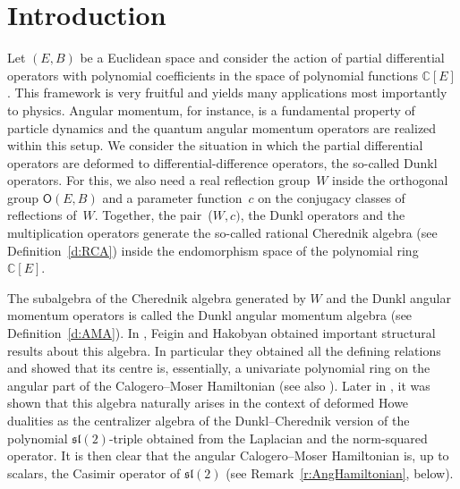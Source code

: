 \documentclass[pdftex]{sigma}
\numberwithin{equation}{section}
\newcommand{\bbc}{\mathbb{C}}
\begin{document}
\section{Introduction}
Let $(E,B)$ be a Euclidean space and consider the action of partial differential operators with polynomial coefficients in the space of polynomial functions $\bbc[E]$. This framework is very fruitful and yields many applications most importantly to physics. Angular momentum, for instance, is a fundamental property of particle dynamics and the quantum angular momentum operators are realized within this setup. We consider the situation in which the partial differential operators are deformed to differential-difference operators, the so-called Dunkl operators. For this, we also need a real reflection group~$W$ inside the orthogonal group $\mathsf{O}(E,B)$ and a parameter function~$c$ on the conjugacy classes of reflections of~$W$. Together, the pair~($W,c)$, the Dunkl operators and the multiplication operators generate the so-called rational Cherednik algebra (see Definition~\ref{d:RCA}) inside the endomorphism space of the polynomial ring~$\mathbb{C}[E]$.

The subalgebra of the Cherednik algebra generated by $W$ and the Dunkl angular momentum operators is called the Dunkl angular momentum algebra (see Definition~\ref{d:AMA}). In \cite{FH15}, Feigin and Hakobyan obtained important structural results about this algebra. In particular they obtained all the defining relations and showed that its centre is, essentially, a univariate polynomial ring on the angular part of the Calogero--Moser Hamiltonian (see also \cite[Remark~3.3]{FH19}). Later in \cite{CDM20}, it was shown that this algebra naturally arises in the context of deformed Howe dualities as the centralizer algebra of the Dunkl--Cherednik version of the polynomial $\mathfrak{sl}(2)$-triple obtained from the Laplacian and the norm-squared operator. It is then clear that the angular Calogero--Moser Hamiltonian is, up to scalars, the Casimir operator of $\mathfrak{sl}(2)$ (see Remark~\ref{r:AngHamiltonian}, below).
\end{document}
